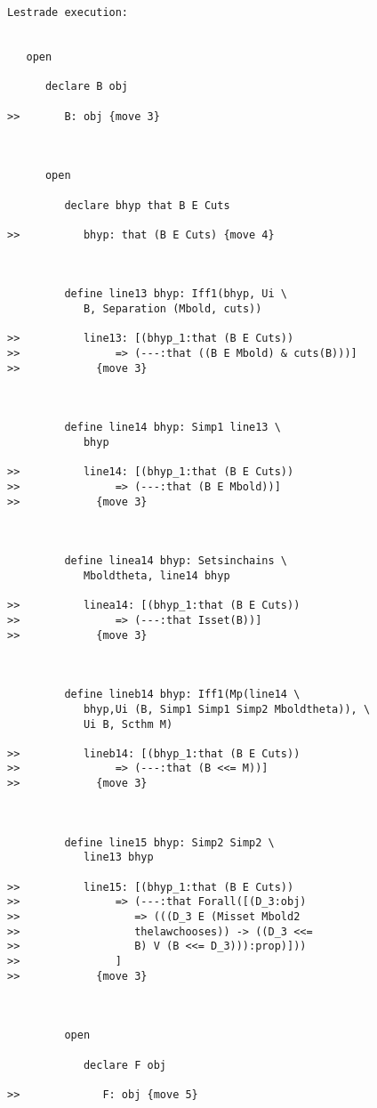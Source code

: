 \documentclass[12pt]{article}
\begin{document}
\begin{verbatim}Lestrade execution:


   open

      declare B obj

>>       B: obj {move 3}



      open

         declare bhyp that B E Cuts

>>          bhyp: that (B E Cuts) {move 4}



         define line13 bhyp: Iff1(bhyp, Ui \
            B, Separation (Mbold, cuts))

>>          line13: [(bhyp_1:that (B E Cuts))
>>               => (---:that ((B E Mbold) & cuts(B)))]
>>            {move 3}



         define line14 bhyp: Simp1 line13 \
            bhyp

>>          line14: [(bhyp_1:that (B E Cuts))
>>               => (---:that (B E Mbold))]
>>            {move 3}



         define linea14 bhyp: Setsinchains \
            Mboldtheta, line14 bhyp

>>          linea14: [(bhyp_1:that (B E Cuts))
>>               => (---:that Isset(B))]
>>            {move 3}



         define lineb14 bhyp: Iff1(Mp(line14 \
            bhyp,Ui (B, Simp1 Simp1 Simp2 Mboldtheta)), \
            Ui B, Scthm M)

>>          lineb14: [(bhyp_1:that (B E Cuts))
>>               => (---:that (B <<= M))]
>>            {move 3}



         define line15 bhyp: Simp2 Simp2 \
            line13 bhyp

>>          line15: [(bhyp_1:that (B E Cuts))
>>               => (---:that Forall([(D_3:obj)
>>                  => (((D_3 E (Misset Mbold2
>>                  thelawchooses)) -> ((D_3 <<=
>>                  B) V (B <<= D_3))):prop)]))
>>               ]
>>            {move 3}



         open

            declare F obj

>>             F: obj {move 5}




\end{verbatim}
\end{document}

